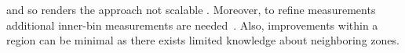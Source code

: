 and so renders the approach not scalable \cite{RGJZ2004}. 
Moreover, to refine measurements
additional inner-bin measurements are needed~\cite{WZS2004}.
Also, improvements within a region can be minimal as there exists
limited knowledge about neighboring zones.
%
%
%
%
%
